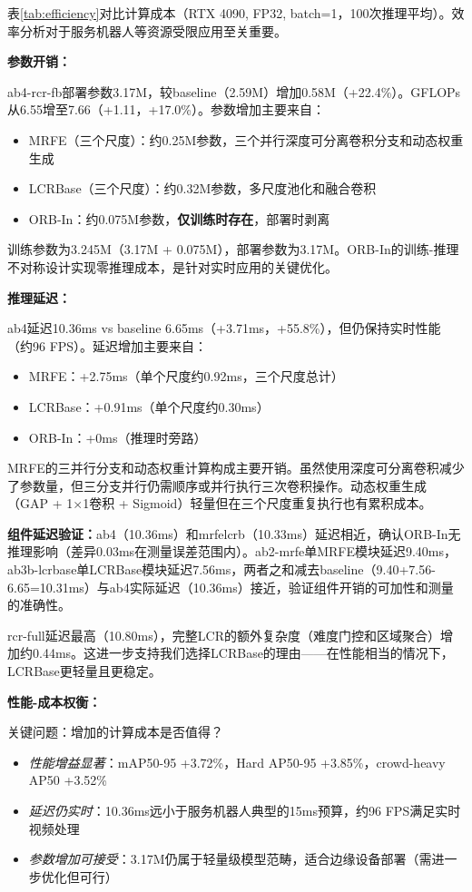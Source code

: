 \documentclass[journal]{IEEEtran}
\begin{document}
表\ref{tab:efficiency}对比计算成本（RTX 4090, FP32, batch=1，100次推理平均）。效率分析对于服务机器人等资源受限应用至关重要。

\textbf{参数开销：}

ab4-rcr-fb部署参数3.17M，较baseline（2.59M）增加0.58M（+22.4\%）。GFLOPs从6.55增至7.66（+1.11，+17.0\%）。参数增加主要来自：

\begin{itemize}
    \item MRFE（三个尺度）：约0.25M参数，三个并行深度可分离卷积分支和动态权重生成
    \item LCRBase（三个尺度）：约0.32M参数，多尺度池化和融合卷积
    \item ORB-In：约0.075M参数，\textbf{仅训练时存在}，部署时剥离
\end{itemize}

训练参数为3.245M（3.17M + 0.075M），部署参数为3.17M。ORB-In的训练-推理不对称设计实现零推理成本，是针对实时应用的关键优化。

\textbf{推理延迟：}

ab4延迟10.36ms vs baseline 6.65ms（+3.71ms，+55.8\%），但仍保持实时性能（约96 FPS）。延迟增加主要来自：

\begin{itemize}
    \item MRFE：+2.75ms（单个尺度约0.92ms，三个尺度总计）
    \item LCRBase：+0.91ms（单个尺度约0.30ms）
    \item ORB-In：+0ms（推理时旁路）
\end{itemize}

MRFE的三并行分支和动态权重计算构成主要开销。虽然使用深度可分离卷积减少了参数量，但三分支并行仍需顺序或并行执行三次卷积操作。动态权重生成（GAP + 1$\times$1卷积 + Sigmoid）轻量但在三个尺度重复执行也有累积成本。

\textbf{组件延迟验证：}ab4（10.36ms）和mrfelcrb（10.33ms）延迟相近，确认ORB-In无推理影响（差异0.03ms在测量误差范围内）。ab2-mrfe单MRFE模块延迟9.40ms，ab3b-lcrbase单LCRBase模块延迟7.56ms，两者之和减去baseline（9.40+7.56-6.65=10.31ms）与ab4实际延迟（10.36ms）接近，验证组件开销的可加性和测量的准确性。

rcr-full延迟最高（10.80ms），完整LCR的额外复杂度（难度门控和区域聚合）增加约0.44ms。这进一步支持我们选择LCRBase的理由——在性能相当的情况下，LCRBase更轻量且更稳定。

\textbf{性能-成本权衡：}

关键问题：增加的计算成本是否值得？

\begin{itemize}
    \item \textit{性能增益显著}：mAP50-95 +3.72\%，Hard AP50-95 +3.85\%，crowd-heavy AP50 +3.52\%
    \item \textit{延迟仍实时}：10.36ms远小于服务机器人典型的15ms预算，约96 FPS满足实时视频处理
    \item \textit{参数增加可接受}：3.17M仍属于轻量级模型范畴，适合边缘设备部署（需进一步优化但可行）
\end{itemize}
\end{document}
